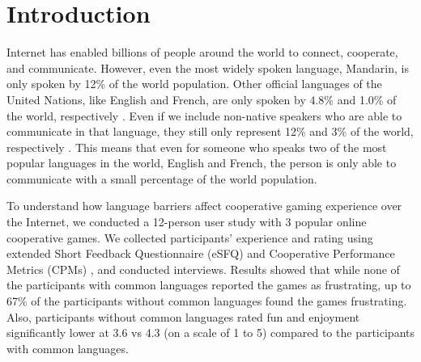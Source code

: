 \section{Introduction}

Internet has enabled billions of people around the world to connect, cooperate, and communicate. However, even the most widely spoken language, Mandarin, is only spoken by 12\% of the world population. 
Other official languages of the United Nations, like English and French, are only spoken by 4.8\% and 1.0\% of the world, respectively \cite{I1}. 
Even if we include non-native speakers who are able to communicate in that language, they still only represent 12\% and 3\% of the world, respectively \cite{I2,I3}. This means that even for someone who speaks two of the most popular languages in the world, English and French, the person is only able to communicate with a small percentage of the world population.

To understand how language barriers affect cooperative gaming experience over the Internet, we conducted a 12-person user study with 3 popular online cooperative games. We collected participants' experience and rating using extended Short Feedback Questionnaire (eSFQ) \cite{eSFQ} and Cooperative Performance Metrics (CPMs) \cite{CPMs}, and conducted interviews. Results showed that while none of the participants with common languages reported the games as frustrating, up to 67\% of the participants without common languages found the games frustrating. Also, participants without common languages rated fun and enjoyment significantly lower at 3.6 vs 4.3 (on a scale of 1 to 5) compared to the participants with common languages. 

%
%

